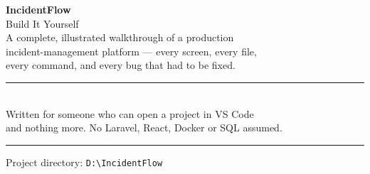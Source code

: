 \documentclass[11pt,a4paper,oneside]{book}
\begin{document}
\frontmatter

\begin{titlepage}
\centering
\vspace*{2.2cm}
{\Huge\bfseries IncidentFlow}\\[0.5cm]
{\LARGE\color{brand} Build It Yourself}\\[1.6cm]
{\large A complete, illustrated walkthrough of a production\\
incident-management platform --- every screen, every file,\\
every command, and every bug that had to be fixed.}\\[1.6cm]
\rule{11cm}{0.4pt}\\[0.5cm]
{\color{muted}\small Written for someone who can open a project in VS Code\\
and nothing more. No Laravel, React, Docker or SQL assumed.}\\[0.4cm]
\rule{11cm}{0.4pt}
\vfill
{\small\color{muted}Project directory: \texttt{D:\textbackslash IncidentFlow}}
\end{titlepage}

\tableofcontents
\mainmatter















\end{document}
